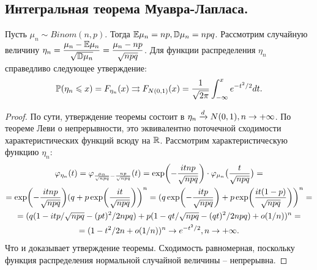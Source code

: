 \subsection{Интегральная теорема Муавра-Лапласа.}
\begin{theorem}
    Пусть $\mu_n \sim Binom(n, p)$.
    Тогда $\mathbb{E} \mu_n = np, \mathbb{D} \mu_n = npq$.
    Рассмотрим случайную величину $\eta_n = \dfrac{\mu_n - \mathbb{E} \mu_n}{\sqrt {\mathbb{D} \mu_n}} = \dfrac{\mu_n - np}{\sqrt {npq}}$.
    Для функции распределения $\eta_n$ справедливо следующее утверждение: \[\mathbb{P}(\eta_n \leqslant x) = F_{\eta_n}(x) \rightrightarrows F_{N(0, 1)}(x) = \dfrac{1}{\sqrt {2\pi}}\int_{-\infty}^x e^{-t^2/2}dt.\]
\end{theorem}
\begin{proof}
    По сути, утверждение теоремы состоит в $\eta_n \xrightarrow{d} N(0, 1), n \rightarrow +\infty$.
    По теореме Леви о непрерывности, это эквивалентно поточечной сходимости характеристических функций всюду на $\mathbb{R}$.
    Рассмотрим характеристическую функцию $\eta_n$:
    \begin{multline*}
        \varphi_{\eta_n}(t) = \varphi_{\frac{\mu_n}{\sqrt {npq}} - \frac{np}{\sqrt {npq}}}(t) = \exp\biggr({-\frac{itnp}{\sqrt {npq}}}\biggr)\cdot \varphi_{\mu_n}\big(\frac{t}{\sqrt {npq}}\big) = \\ = \exp\biggr({-\frac{itnp}{\sqrt {npq}}}\biggr)(q + p\exp\biggr({\frac{it}{\sqrt {npq}}}\biggr)\biggr)^n
        = (q\exp\biggr({-\frac{itp}{\sqrt {npq}}}\biggr) + p\exp\biggr({\frac{it(1 - p)}{\sqrt {npq}}}\biggr)\biggr)^n = \\ = (q(1 - itp/\sqrt {npq} - (pt)^2/2npq) + p(1 - qt/\sqrt {npq} - (qt)^2/2npq) + o(1/n))^n = \\ =
        (1 - t^2/2n + o(1/n))^n \rightarrow e^{-t^2/2}, n \rightarrow +\infty.
    \end{multline*}
    Что и доказывает утверждение теоремы.
    Сходимость равномерная, поскольку функция распределения нормальной случайной величины -- непрерывна.
\end{proof}
